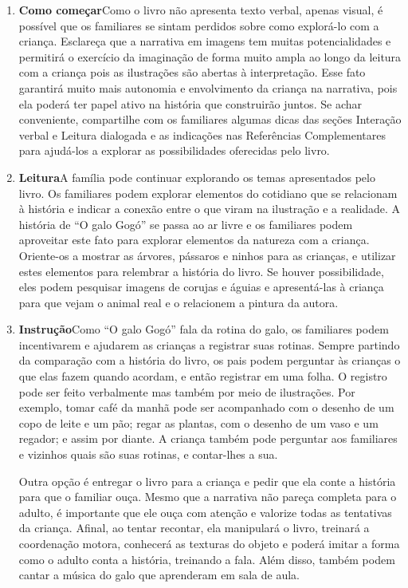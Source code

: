\documentclass[11pt]{extarticle}
\begin{document}

\begin{enumerate}
\item \textbf{Como começar}\quad Como o livro não apresenta 
texto verbal, apenas visual, é possível que os familiares se sintam 
perdidos sobre como explorá-lo com a criança. Esclareça que a narrativa 
em imagens tem muitas potencialidades e permitirá o exercício da imaginação 
de forma muito ampla ao longo da leitura com a criança pois as ilustrações são 
abertas à interpretação. Esse fato garantirá muito mais autonomia e 
envolvimento da criança na narrativa, pois ela poderá ter papel ativo na 
história que construirão juntos. Se achar conveniente, compartilhe com 
os familiares algumas dicas das seções Interação verbal 
e Leitura dialogada e as indicações nas Referências Complementares 
para ajudá-los a explorar as possibilidades oferecidas pelo livro. 

\item \textbf{Leitura}\quad A família pode continuar 
explorando os temas apresentados pelo livro. Os familiares podem explorar 
elementos do cotidiano que se relacionam à história e indicar a conexão 
entre o que viram na ilustração e a realidade. A história de “O galo Gogó” se passa ao ar livre e os familiares podem aproveitar este fato 
para explorar elementos da natureza com a criança. Oriente-os a mostrar as 
árvores, pássaros e ninhos para as crianças, e utilizar estes elementos para 
relembrar a história do livro. Se houver possibilidade, eles podem pesquisar 
imagens de corujas e águias e apresentá-las à criança para que vejam o animal 
real e o relacionem a pintura da autora. 

\item \textbf{Instrução}\quad Como ``O galo Gogó'' fala da rotina
do galo, os familiares podem incentivarem e ajudarem as crianças
a registrar suas rotinas. Sempre partindo da comparação com a história
do livro, os pais podem perguntar às crianças o que elas fazem quando acordam,
e então registrar em uma folha. O registro pode ser feito verbalmente
mas também por meio de ilustrações. Por exemplo, tomar café da manhã
pode ser acompanhado com o desenho de um copo de leite e um pão; regar as plantas,
com o desenho de um vaso e um regador; e assim por diante. 
A criança também pode perguntar aos familiares e vizinhos quais são suas
rotinas, e contar-lhes a sua. 

Outra opção é entregar o livro para a criança e pedir que ela conte 
a história para que o familiar ouça. Mesmo que a narrativa não pareça 
completa para o adulto, é importante que ele ouça com atenção e 
valorize todas as tentativas da criança. Afinal, ao tentar recontar, 
ela manipulará o livro, treinará a coordenação motora, conhecerá as texturas 
do objeto e poderá imitar a forma como o adulto 
conta a história, treinando a fala. Além disso, também podem cantar
a música do galo que aprenderam em sala de aula. 

\end{enumerate}
\end{document}
